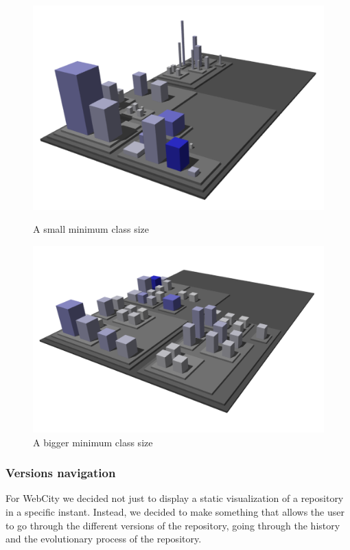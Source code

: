 \documentclass[]{usiinfbachelorproject}
\begin{document}
\begin{figure}[H]
  \centering
  \begin{minipage}[b]{0.49\textwidth}
      \includegraphics[width=1\textwidth]{pictures/small.png}
      \caption{A small minimum class size}
      \label{fig:sizes small}
  \end{minipage}
  \hfill
  \begin{minipage}[b]{0.49\textwidth}
    \includegraphics[width=1\textwidth]{pictures/big.png}
    \caption{A bigger minimum class size}
    \label{fig:sizes small}
  \end{minipage}
\end{figure}

\subsubsection{Versions navigation} \label{Version navigation}
For WebCity we decided not just to display a static visualization of a repository in a specific instant. Instead, we
decided to make something that allows the user to go through the different versions of the repository, going through the history and the evolutionary process of the repository.
\end{document}

